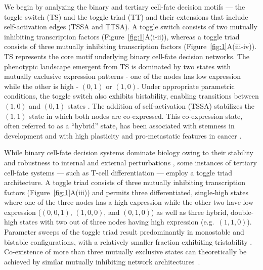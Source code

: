 \documentclass[11pt]{article}
\begin{document}
We begin by analyzing the binary and tertiary cell-fate decision motifs --- the toggle switch (TS) and the toggle triad (TT) and their extensions that include self-activation edges (TSSA and TTSA). A toggle switch consists of two mutually inhibiting transcription factors (Figure~\ref{fig:1}A(i-ii)), whereas a toggle triad consists of three mutually inhibiting transcription factors (Figure~\ref{fig:1}A(iii-iv)). TS represents the core motif underlying binary cell-fate decision networks. The phenotypic landscape emergent from TS is dominated by two states with mutually exclusive expression patterns - one of the nodes has low expression while the other is high - $(0,1)$ or $(1,0)$. Under appropriate parametric conditions, the toggle switch also exhibits bistability, enabling transitions between $(1,0)$ and $(0,1)$ states \cite{gardner2000construction}. The addition of self-activation (TSSA) stabilizes the $(1,1)$ state in which both nodes are co-expressed. This co-expression state, often referred to as a ``hybrid'' state, has been associated with stemness in development \cite{Roeder2006TowardsPU.1} and with high plasticity and pro-metastatic features in cancer \cite{jolly2015implications,jolly2018hybrid,Pastushenko2019EMTMetastasis}.

While binary cell-fate decision systems dominate biology owing to their stability and robustness to internal and external perturbations \cite{harlapur2022functional, Shyam2025MutuallyNetworks}, some instances of tertiary cell-fate systems --- such as T-cell differentiation --- employ a toggle triad architecture. A toggle triad consists of three mutually inhibiting transcription factors (Figure~\ref{fig:1}A(iii)) and permits three differentiated, single-high states where one of the three nodes has a high expression while the other two have low expression ($(0,0,1)$, $(1,0,0)$, and $(0,1,0)$) as well as three hybrid, double-high states with two out of three nodes having high expression (e.g.\ $(1,1,0)$). Parameter sweeps of the toggle triad result predominantly in monostable and bistable configurations, with a relatively smaller fraction exhibiting tristability \cite{doi:10.1098/rsif.2020.0631}. Co-existence of more than three mutually exclusive states can theoretically be achieved by similar mutually inhibiting network architectures~\cite{Bv2026GeneDecisions}.
\end{document}
